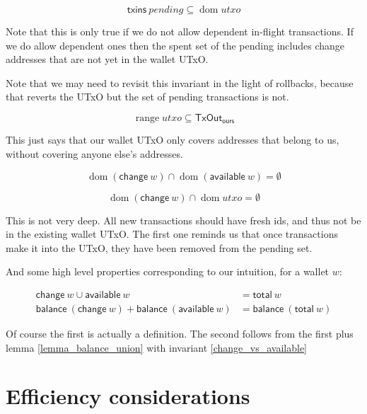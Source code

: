 \documentclass{article}
\DeclareMathOperator{\dom}{dom}
\DeclareMathOperator{\range}{range}
\begin{document}
\begin{equation} \label{txins_in_dom_utxo}
\mathsf{txins} ~ pending \subseteq \dom utxo
\end{equation}

Note that this is only true if we do not allow dependent in-flight transactions.
If we do allow dependent ones then the spent set of the pending includes change
addresses that are not yet in the wallet UTxO.

Note that we may need to revisit this invariant in the light of rollbacks,
because that reverts the UTxO but the set of pending transactions is not.

\begin{equation}
\range utxo \subseteq \mathsf{TxOut_{ours}}
\end{equation}

This just says that our wallet UTxO only covers addresses that belong to us,
without covering anyone else's addresses.

\begin{equation} \label{change_vs_available}
\dom (\mathsf{change} ~ w) \cap \dom (\mathsf{available} ~ w) = \emptyset
\end{equation}

\begin{equation} \label{change_vs_utxo}
\dom (\mathsf{change} ~ w) \cap \dom utxo = \emptyset
\end{equation}

This is not very deep. All new transactions should have fresh ids, and thus
not be in the existing wallet UTxO. The first one reminds us that once
transactions make it into the UTxO, they have been removed from the pending set.

And some high level properties corresponding to our intuition, for a wallet $w$:

\begin{equation}
\begin{split}
\mathsf{change} ~ w \cup \mathsf{available} ~ w &= \mathsf{total} ~ w \\
\mathsf{balance} ~ (\mathsf{change} ~ w) + \mathsf{balance} ~ (\mathsf{available} ~ w) &= \mathsf{balance} ~ (\mathsf{total} ~ w)
\end{split}
\end{equation}

Of course the first is actually a definition. The second follows from the
first plus lemma \ref{lemma_balance_union} with invariant \ref{change_vs_available}


\section{Efficiency considerations}
\end{document}
